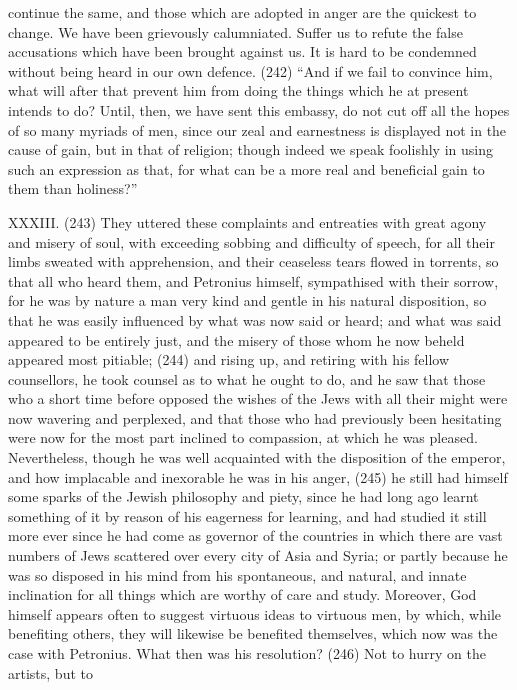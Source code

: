 continue the same, and those which are adopted in anger are the quickest to change. We have
been grievously calumniated. Suffer us to refute the false accusations which have been brought
against us. It is hard to be condemned without being heard in our own defence. (242) ``And if we fail
to convince him, what will after that prevent him from doing the things which he at present intends to
do? Until, then, we have sent this embassy, do not cut off all the hopes of so many myriads of men,
since our zeal and earnestness is displayed not in the cause of gain, but in that of religion; though
indeed we speak foolishly in using such an expression as that, for what can be a more real and
beneficial gain to them than holiness?''

XXXIII. (243) They uttered these complaints and entreaties with great agony and misery of soul,
with exceeding sobbing and difficulty of speech, for all their limbs sweated with apprehension, and
their ceaseless tears flowed in torrents, so that all who heard them, and Petronius himself,
sympathised with their sorrow, for he was by nature a man very kind and gentle in his natural
disposition, so that he was easily influenced by what was now said or heard; and what was said
appeared to be entirely just, and the misery of those whom he now beheld appeared most pitiable;
(244) and rising up, and retiring with his fellow counsellors, he took counsel as to what he ought to
do, and he saw that those who a short time before opposed the wishes of the Jews with all their
might were now wavering and perplexed, and that those who had previously been hesitating were
now for the most part inclined to compassion, at which he was pleased. Nevertheless, though he
was well acquainted with the disposition of the emperor, and how implacable and inexorable he was
in his anger, (245) he still had himself some sparks of the Jewish philosophy and piety, since he
had long ago learnt something of it by reason of his eagerness for learning, and had studied it still
more ever since he had come as governor of the countries in which there are vast numbers of
Jews scattered over every city of Asia and Syria; or partly because he was so disposed in his
mind from his spontaneous, and natural, and innate inclination for all things which are worthy of
care and study. Moreover, God himself appears often to suggest virtuous ideas to virtuous men,
by which, while benefiting others, they will likewise be benefited themselves, which now was the
case with Petronius. What then was his resolution? (246) Not to hurry on the artists, but to
